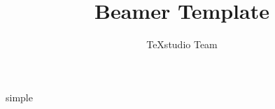 \documentclass{beamer}
\title{Beamer Template}
\author{TeXstudio Team}
\begin{document}
\begin{frame}[plain]
	simple
\end{frame}
\end{document}
